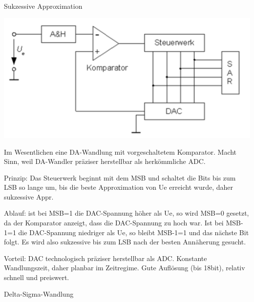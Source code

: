 \documentclass[a4paper]{article}
\begin{document}
\begin{multicols}{3}
  Sukzessive Approximation

  \begin{itemize*}
    \item \includegraphics[width=.5\linewidth]{Assets/Biosignalverarbeitung-Sukzessive-Approximation.png}
    \item Im Wesentlichen eine DA-Wandlung mit vorgeschaltetem Komparator. Macht Sinn, weil DA-Wandler präziser herstellbar als herkömmliche ADC.
    \item Prinzip: Das Steuerwerk beginnt mit dem MSB und schaltet die Bits bis zum LSB so lange um, bis die beste Approximation von Ue erreicht wurde, daher sukzessive Appr.
    \item Ablauf: ist bei MSB=1 die DAC-Spannung höher als Ue, so wird MSB=0 gesetzt, da der Komparator anzeigt, dass die DAC-Spannung zu hoch war. Ist bei MSB-1=1 die DAC-Spannung niedriger als Ue, so bleibt MSB-1=1 und das nächste Bit folgt. Es wird also sukzessive bis zum LSB nach der besten Annäherung gesucht.
    \item Vorteil: DAC technologisch präziser herstellbar als ADC. Konstante Wandlungszeit, daher planbar im Zeitregime. Gute Auflösung (bis 18bit), relativ schnell und preiswert.
  \end{itemize*}

  Delta-Sigma-Wandlung


\end{multicols}
\end{document}
